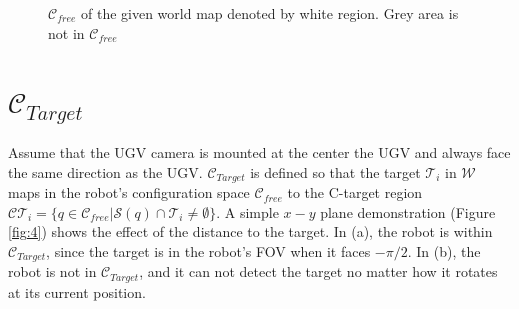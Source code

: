 \documentclass[12pt,draftcls,onecolumn]{IEEEtran}
\begin{document}
\begin{figure}[htp]
  \centering
  \quad
  \caption{ $\mathcal{C}_{free}$  of the given world map denoted by white region. Grey area is not in  $\mathcal{C}_{free}$ }
  \label{fig:6}
\end{figure}


\clearpage


\section{$\mathcal{C}_{Target}$} 


Assume that the UGV camera is mounted at the center the UGV and always face the same direction as the UGV.
$\mathcal{C}_{Target}$  is defined so that the target $\mathcal{T}_i$ in $\mathcal{W}$ maps  in the robot's configuration space  $\mathcal{C}_{free}$ to the C-target region  $\mathcal{CT}_i = \{q \in \mathcal{C}_{free}    |    \mathcal{S}(q) \cap \mathcal{T}_i  \neq  \emptyset \}$.
A simple $x-y$ plane demonstration (Figure \ref{fig:4}) shows the effect of the distance to the target.
In (a), the robot is within $\mathcal{C}_{Target}$, since the target is in the robot's FOV when it faces $-\pi/2$.
In (b), the robot is not in $\mathcal{C}_{Target}$, and it can not detect the target no matter how it rotates at its current position. 
\end{document}
